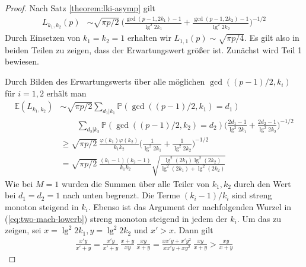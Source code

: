 \documentclass[a4paper, 11pt, ngerman]{article}
\newcommand{\E}{\mathbb{E}}
\renewcommand{\P}{\mathbb{P}}
\theoremstyle{definition}
\theoremstyle{plain}
\theoremstyle{remark}
\begin{document}
\begin{proof}
    Nach Satz \ref{theorem:lki-asymp} gilt
    \begin{align*}
        L_{k_1, k_2}(p)
         & \sim \sqrt{\pi p / 2} \
        \Bigg ( \frac {\gcd(p - 1, 2k_1) - 1} {\lg^2 2k_1} +
        \frac {\gcd(p -1, 2k_2) - 1} {\lg^2 2k_2} \Bigg )^{-1/2}
    \end{align*}
    Durch Einsetzen von $k_1 = k_2 = 1$ erhalten wir $L_{1, 1}(p) \sim \sqrt{\pi p / 4}$. Es gilt also in beiden Teilen zu zeigen, dass der Erwartungswert größer ist. Zunächst wird Teil 1 bewiesen.

    Durch Bilden des Erwartungswerts über alle möglichen $\gcd((p - 1)/2, k_i)$ für $i = 1, 2$ erhält man
    \begin{align}
        \E(L_{k_1, k_2})
         & \sim \sqrt{\pi p / 2}
        \sum_{d_1 | k_1} \P(\gcd((p - 1)/2, k_1) = d_1)
        \nonumber                                                 \\
         & \qquad \sum_{d_2 | k_2} \P(\gcd((p - 1)/2, k_2) = d_2)
        \Bigg ( \frac {2d_1 - 1} {\lg^2 2k_1}
        + \frac {2d_2 - 1} {\lg^2 2k_2} \Bigg )^{-1/2}
        \nonumber                                                 \\
         & \ge \sqrt{\pi p / 2} \
        \frac {\varphi(k_1) \varphi(k_2)} {k_1k_2}
        \Bigg (\frac 1 {\lg^2 2k_1} + \frac 1 {\lg^2 2k_2} \Bigg )^{-1/2}
        \nonumber                                                 \\
         & = \sqrt{\pi p / 2} \
        \frac {(k_1 - 1) (k_2- 1)} {k_1k_2}
        \sqrt{\frac{\lg^2(2k_1) \lg^2(2k_2)}{\lg^2(2k_1) + \lg^2(2k_2)}}
        \label{eq:two-mach-lowerb}
    \end{align}
    Wie bei $M = 1$ wurden die Summen über alle Teiler von $k_1, k_2$ durch den Wert bei $d_1 = d_2 = 1$ nach unten begrenzt. Die Terme $(k_i - 1)/k_i$ sind streng monoton steigend in $k_i$. Ebenso ist das Argument der nachfolgenden Wurzel in (\ref{eq:two-mach-lowerb}) streng monoton steigend in jedem der $k_i$. Um das zu zeigen, sei $x = \lg^2 2k_1, y = \lg^2 2k_2$ und $x' > x$. Dann gilt
    \begin{align*}
        \frac {x'y} {x' + y}
        = \frac {x'y} {x' + y} \, \frac {x + y} {xy} \, \frac {xy} {x + y}
        = \frac {xx'y + x'y^2} {xx'y + xy^2} \, \frac {xy} {x + y}
        > \frac {xy} {x + y}
    \end{align*}

\end{proof}
\end{document}
